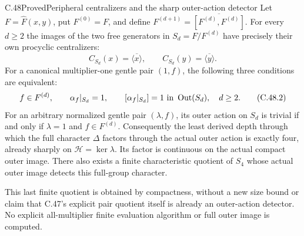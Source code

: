 \begin{statement}{C.48}{Proved}{Peripheral centralizers and the sharp outer-action detector}
Let $F=\widehat F(x,y)$, put $F^{(0)}=F$, and define
$F^{(d+1)}=\overline{[F^{(d)},F^{(d)}]}$.
For every $d\geq2$ the images of the two free generators in
$S_d=F/F^{(d)}$ have precisely their own procyclic centralizers:
\[
 C_{S_d}(x)=\overline{\langle x\rangle},\qquad
 C_{S_d}(y)=\overline{\langle y\rangle}.                 \tag{C.48.1}
\]
For a canonical multiplier-one gentle pair $(1,f)$, the following
three conditions are equivalent:
\[
 f\in F^{(d)},\qquad
 \alpha_f|_{S_d}=1,\qquad
 [\alpha_f|_{S_d}]=1\ \hbox{in }\operatorname{Out}(S_d),
 \quad d\geq2.                                       \tag{C.48.2}
\]
For an arbitrary normalized gentle pair $(\lambda,f)$, its outer
action on $S_d$ is trivial if and only if $\lambda=1$ and
$f\in F^{(d)}$. Consequently the least derived depth through which
the full character $\Delta$ factors through the actual outer action
is exactly four, already sharply on $\mathcal H=\ker\lambda$.
Its factor is continuous on the actual compact outer image.
There also exists a finite characteristic quotient of $S_4$
whose actual outer image detects this full-group character.

This last finite quotient is obtained by compactness, without a
new size bound or claim that C.47's explicit pair quotient itself
is already an outer-action detector. No explicit all-multiplier
finite evaluation algorithm or full outer image is computed.
\end{statement}

